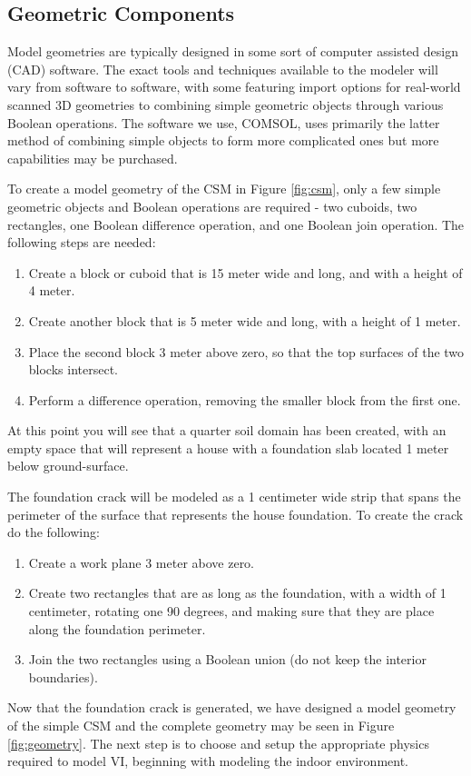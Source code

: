 \subsection{Geometric Components}

Model geometries are typically designed in some sort of computer assisted design (CAD) software.
The exact tools and techniques available to the modeler will vary from software to software, with some featuring import options for real-world scanned 3D geometries to combining simple geometric objects through various Boolean operations.
The software we use, COMSOL, uses primarily the latter method of combining simple objects to form more complicated ones but more capabilities may be purchased.\par

To create a model geometry of the CSM in Figure \ref{fig:csm}, only a few simple geometric objects and Boolean operations are required - two cuboids, two rectangles, one Boolean difference operation, and one Boolean join operation.
The following steps are needed:
\begin{enumerate}
  \item Create a block or cuboid that is 15 meter wide and long, and with a height of 4 meter.
  \item Create another block that is 5 meter wide and long, with a height of 1 meter.
  \item Place the second block 3 meter above zero, so that the top surfaces of the two blocks intersect.
  \item Perform a difference operation, removing the smaller block from the first one.
\end{enumerate}
At this point you will see that a quarter soil domain has been created, with an empty space that will represent a house with a foundation slab located 1 meter below ground-surface.\par

The foundation crack will be modeled as a 1 centimeter wide strip that spans the perimeter of the surface that represents the house foundation.
To create the crack do the following:
\begin{enumerate}
  \item Create a work plane 3 meter above zero.
  \item Create two rectangles that are as long as the foundation, with a width of 1 centimeter, rotating one 90 degrees, and making sure that they are place along the foundation perimeter.
  \item Join the two rectangles using a Boolean union (do not keep the interior boundaries).
\end{enumerate}
Now that the foundation crack is generated, we have designed a model geometry of the simple CSM and the complete geometry may be seen in Figure \ref{fig:geometry}.
The next step is to choose and setup the appropriate physics required to model VI, beginning with modeling the indoor environment.\par

